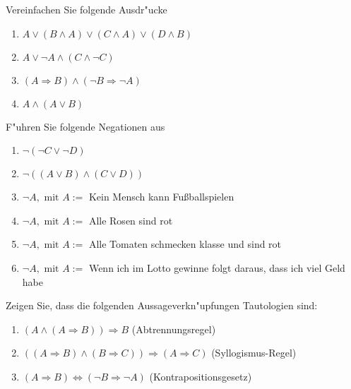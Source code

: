 Vereinfachen Sie folgende Ausdr"ucke
\begin{enumerate}
	\item $A \lor (B \land A) \lor (C \land A) \lor (D \land B)$
	\item $A \lor \neg A \land (C \land \neg C)$
	\item $(A \Rightarrow B) \land (\neg B \Rightarrow \neg A)$
	\item $A \land (A \lor B)$
\end{enumerate}

F"uhren Sie folgende Negationen aus
\begin{enumerate}
	\item $\neg (\neg C \lor \neg D)$
	\item $\neg ((A \lor B) \land (C \lor D))$
	\item $\neg A, \text{ mit } A:= $ Kein Mensch kann Fu{\ss}ballspielen
	\item $\neg A, \text{ mit } A := $ Alle Rosen sind rot
	\item $\neg A, \text{ mit } A := $ Alle Tomaten schmecken klasse und sind rot
	\item $\neg A, \text{ mit } A := $ Wenn ich im Lotto gewinne folgt daraus, dass ich viel Geld habe
\end{enumerate}

Zeigen Sie, dass die folgenden Aussageverkn"upfungen Tautologien sind:
\begin{enumerate}
	\item $(A \land (A \Rightarrow B)) \Rightarrow B$ (Abtrennungsregel)
	\item $((A \Rightarrow B) \land (B \Rightarrow C)) \Rightarrow (A \Rightarrow C)$ (Syllogismus-Regel)
	\item $(A \Rightarrow B) \iff (\neg B \Rightarrow \neg A)$ (Kontrapositionsgesetz)
\end{enumerate}


